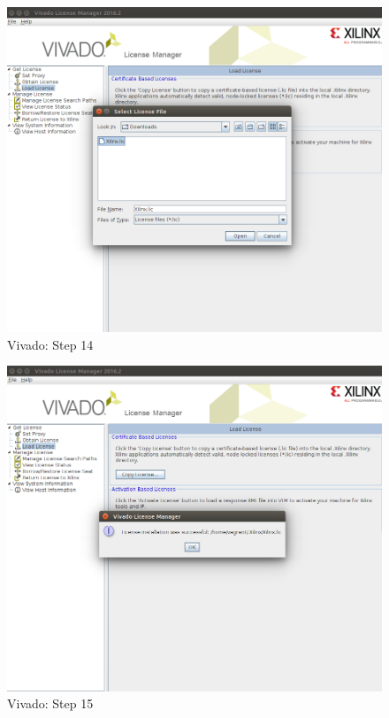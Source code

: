 \begin{figure}
    \centering
    \includegraphics[width=1\textwidth,trim={0 8cm 0 8cm},clip]{images/devguide/vivado-install-19.png}
    \caption[Vivado: Step 14]{%
    Vivado: Step 14
    }
    \label{fig:devguide:vivado}
\end{figure}

\begin{figure}
    \centering
    \includegraphics[width=1\textwidth,trim={0 8cm 0 8cm},clip]{images/devguide/vivado-install-20.png}
    \caption[Vivado: Step 15]{%
    Vivado: Step 15
    }
    \label{fig:devguide:vivado}
\end{figure}

